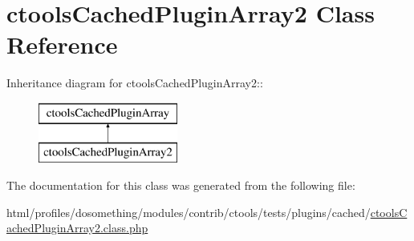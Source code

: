 \hypertarget{classctoolsCachedPluginArray2}{
\section{ctoolsCachedPluginArray2 Class Reference}
\label{classctoolsCachedPluginArray2}
}
Inheritance diagram for ctoolsCachedPluginArray2::\begin{figure}[H]
\begin{center}
\leavevmode
\includegraphics[height=2cm]{classctoolsCachedPluginArray2}
\end{center}
\end{figure}


The documentation for this class was generated from the following file:\begin{DoxyCompactItemize}
\item 
html/profiles/dosomething/modules/contrib/ctools/tests/plugins/cached/\hyperlink{ctoolsCachedPluginArray2_8class_8php}{ctoolsCachedPluginArray2.class.php}\end{DoxyCompactItemize}
